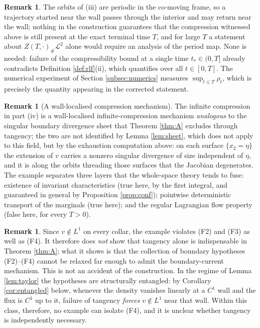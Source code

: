 \documentclass[11pt]{amsart}
\theoremstyle{definition}
\newtheorem{remark}[theorem]{Remark}
\newcommand{\LL}[1]{\mathcal{L}^{#1}}
\begin{document}
\begin{remark}
\label{rem:intermediate}
The orbits of (iii) are periodic in the co-moving frame, so a
trajectory started near the wall passes through the interior and may
return near the wall; nothing in the construction guarantees that
the compression witnessed above is still present at the exact
terminal time $T$, and for large $T$ a statement about
$Z(T,\cdot)_\#\LL{2}$ alone would require an analysis of the period
map. None is needed: failure of the compressibility bound at a
single time $t_*\in(0,T]$ already contradicts Definition
\ref{def:rlf}(ii), which quantifies over all $t\in[0,T]$. The
numerical experiment of Section \ref{subsec:numerics} measures
$\sup_{t\le T}\rho_t$, which is precisely the quantity appearing in
the corrected statement.
\end{remark}

\begin{remark}[A wall-localised compression mechanism]
\label{rem:coherence}
The infinite compression in part (iv) is a wall-localised
infinite-compression mechanism \emph{analogous} to the singular
boundary divergence sheet that Theorem \ref{thm:A} excludes through
tangency; the two are not identified by Lemma \ref{lem:sheet}, which
does not apply to this field, but by the exhaustion computation
above: on each surface $\{x_2=\eta\}$ the extension of $v$ carries a
nonzero singular divergence of size independent of $\eta$, and it is
along the orbits threading those surfaces that the Jacobian
degenerates. The example separates three layers that the
whole-space theory tends to fuse: existence of invariant
characteristics (true here, by the first integral, and guaranteed in
general by Proposition \ref{prop:conf}); pointwise deterministic
transport of the marginals (true here); and the regular Lagrangian
flow property (false here, for every $T>0$).
\end{remark}

\begin{remark}\label{rem:whatitshows}
Since $v\notin L^1$ on every collar, the example violates
\textup{(F2)} and \textup{(F3)} as well as \textup{(F4)}. It
therefore does \emph{not} show that tangency alone is
indispensable in Theorem \ref{thm:A}; what it shows is that the
collection of boundary hypotheses \textup{(F2)--(F4)} cannot be
relaxed far enough to admit the boundary-current mechanism. This is
not an accident of the construction. In the regime of Lemma
\ref{lem:taylor} the hypotheses are structurally entangled: by
Corollary \ref{cor:entangled} below, whenever the density vanishes
linearly at a $C^1$ wall and the flux is $C^1$ up to it, failure of
tangency \emph{forces} $v\notin L^1$ near that wall. Within this
class, therefore, no example can isolate \textup{(F4)}, and it is unclear whether tangency is independently necessary. %
\end{remark}
\end{document}
